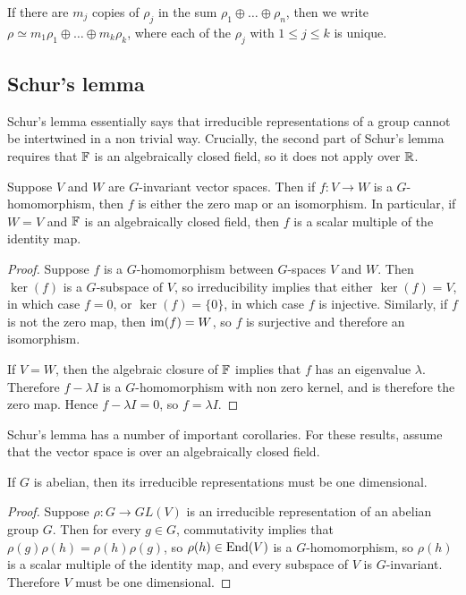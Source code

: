 \documentclass[a4paper]{article}
\begin{document}
If there are $m_j$ copies of $\rho_j$ in the sum $\rho_1 \oplus \hdots \oplus \rho_n$, then we write $\rho \simeq m_1 \rho_1 \oplus \hdots \oplus m_k \rho_k$, where each of the $\rho_j$ with $1 \leq j \leq k$ is unique.

\subsection{Schur's lemma} 

Schur's lemma essentially says that irreducible representations of a group cannot be intertwined in a non trivial way. Crucially, the second part of Schur's lemma requires that $\mathbb{F}$ is an algebraically closed field, so it does not apply over $\mathbb{R}$.

\begin{lemma}
    Suppose $V$ and $W$ are $G$-invariant vector spaces. Then if $f:V \to W$ is a $G$-homomorphism, then $f$ is either the zero map or an isomorphism. In particular, if $W = V$ and $\mathbb{F}$ is an algebraically closed field, then $f$ is a scalar multiple of the identity map.
\end{lemma}

\begin{proof}
    Suppose $f$ is a $G$-homomorphism between $G$-spaces $V$ and $W$. Then $\ker(f)$ is a $G$-subspace of $V$, so irreducibility implies that either $\ker(f) = V$, in which case $f = 0$, or $\ker(f) = \{0\}$, in which case $f$ is injective. Similarly, if $f$ is not the zero map, then $\operatorname{im}(f)= W$, so $f$ is surjective and therefore an isomorphism. 

    If $V = W$, then the algebraic closure of $\mathbb{F}$ implies that $f$ has an eigenvalue $\lambda$. Therefore $f - \lambda I$ is a $G$-homomorphism with non zero kernel, and is therefore the zero map. Hence $f - \lambda I = 0$, so $f = \lambda I$.
\end{proof}

Schur's lemma has a number of important corollaries. For these results, assume that the vector space is over an algebraically closed field.

\begin{cor}
    If $G$ is abelian, then its irreducible representations must be one dimensional.
\end{cor}

\begin{proof}
    Suppose $\rho:G \to GL(V)$ is an irreducible representation of an abelian group $G$. Then for every $g \in G$, commutativity implies that $\rho(g)\rho(h) = \rho(h)\rho(g)$, so $\rho(h) \in \operatorname{End}(V)$ is a $G$-homomorphism, so $\rho(h)$ is a scalar multiple of the identity map, and every subspace of $V$ is $G$-invariant. Therefore $V$ must be one dimensional.
\end{proof}
\end{document}

